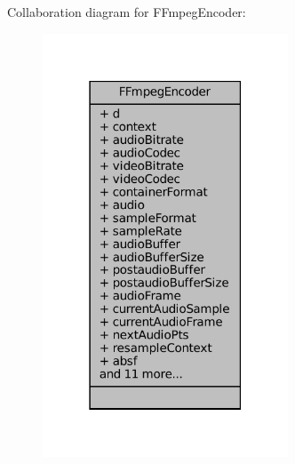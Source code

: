Collaboration diagram for F\+Fmpeg\+Encoder\+:
\nopagebreak
\begin{figure}[H]
\begin{center}
\leavevmode
\includegraphics[width=207pt]{struct_f_fmpeg_encoder__coll__graph}
\end{center}
\end{figure}
